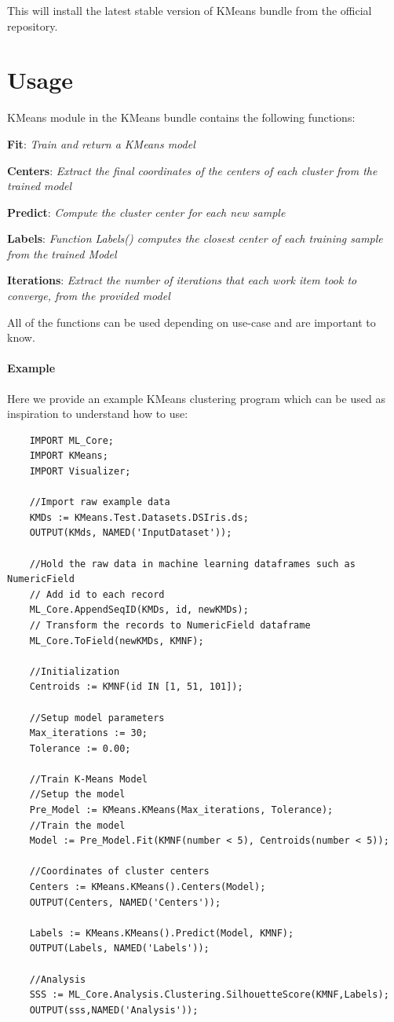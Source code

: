 \documentclass[a4paper,oneside,12pt]{book}
\begin{document}
This will install the latest stable version of KMeans bundle from the official repository.

\section{Usage}

KMeans module in the KMeans bundle contains the following functions:

\textbf{Fit}: \textit{Train and return a KMeans model}

\textbf{Centers}: \textit{Extract the final coordinates of the centers of each cluster from the trained model}

\textbf{Predict}: \textit{Compute the cluster center for each new sample}

\textbf{Labels}: \textit{Function Labels() computes the closest center of each training sample from the trained Model}

\textbf{Iterations}: \textit{Extract the number of iterations that each work item took to converge, from the provided model}

All of the functions can be used depending on use-case and are important to know.

\paragraph{Example}

Here we provide an example KMeans clustering program which can be used as inspiration to understand how to use:

\begin{lstlisting}
    IMPORT ML_Core;
    IMPORT KMeans;
    IMPORT Visualizer;
    
    //Import raw example data
    KMDs := KMeans.Test.Datasets.DSIris.ds;
    OUTPUT(KMds, NAMED('InputDataset'));
    
    //Hold the raw data in machine learning dataframes such as NumericField
    // Add id to each record
    ML_Core.AppendSeqID(KMDs, id, newKMDs);
    // Transform the records to NumericField dataframe
    ML_Core.ToField(newKMDs, KMNF);
    
    //Initialization
    Centroids := KMNF(id IN [1, 51, 101]);
    
    //Setup model parameters
    Max_iterations := 30;
    Tolerance := 0.00;
    
    //Train K-Means Model
    //Setup the model
    Pre_Model := KMeans.KMeans(Max_iterations, Tolerance);
    //Train the model
    Model := Pre_Model.Fit(KMNF(number < 5), Centroids(number < 5));
    
    //Coordinates of cluster centers
    Centers := KMeans.KMeans().Centers(Model);
    OUTPUT(Centers, NAMED('Centers'));
    
    Labels := KMeans.KMeans().Predict(Model, KMNF);
    OUTPUT(Labels, NAMED('Labels'));
    
    //Analysis
    SSS := ML_Core.Analysis.Clustering.SilhouetteScore(KMNF,Labels);
    OUTPUT(sss,NAMED('Analysis'));
\end{lstlisting}
\end{document}
